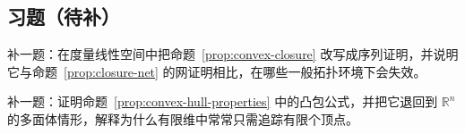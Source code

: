 \subsection*{习题（待补）}

\begin{exercise}[闭包保凸的序列版桥接题]\label{exr:convex-closure-sequence-placeholder}
补一题：在度量线性空间中把命题~\ref{prop:convex-closure} 改写成序列证明，并说明它与命题~\ref{prop:closure-net} 的网证明相比，在哪些一般拓扑环境下会失效。
\end{exercise}

\begin{exercise}[凸包有限表示占位]\label{exr:convex-hull-placeholder}
补一题：证明命题~\ref{prop:convex-hull-properties} 中的凸包公式，并把它退回到 $\mathbb R^n$ 的多面体情形，解释为什么有限维中常常只需追踪有限个顶点。
\end{exercise}
